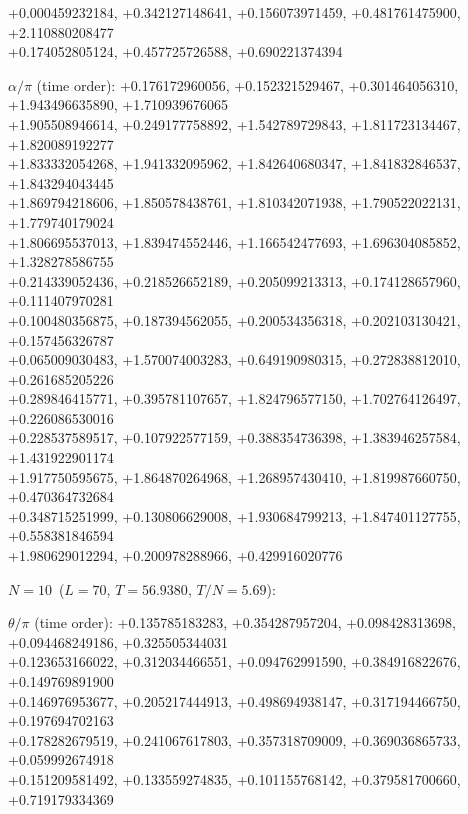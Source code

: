 \begin{flushleft}
+0.000459232184, +0.342127148641, +0.156073971459, +0.481761475900, +2.110880208477 \\
+0.174052805124, +0.457725726588, +0.690221374394
\par\noindent$\alpha/\pi$ (time order):
+0.176172960056, +0.152321529467, +0.301464056310, +1.943496635890, +1.710939676065 \\
+1.905508946614, +0.249177758892, +1.542789729843, +1.811723134467, +1.820089192277 \\
+1.833332054268, +1.941332095962, +1.842640680347, +1.841832846537, +1.843294043445 \\
+1.869794218606, +1.850578438761, +1.810342071938, +1.790522022131, +1.779740179024 \\
+1.806695537013, +1.839474552446, +1.166542477693, +1.696304085852, +1.328278586755 \\
+0.214339052436, +0.218526652189, +0.205099213313, +0.174128657960, +0.111407970281 \\
+0.100480356875, +0.187394562055, +0.200534356318, +0.202103130421, +0.157456326787 \\
+0.065009030483, +1.570074003283, +0.649190980315, +0.272838812010, +0.261685205226 \\
+0.289846415771, +0.395781107657, +1.824796577150, +1.702764126497, +0.226086530016 \\
+0.228537589517, +0.107922577159, +0.388354736398, +1.383946257584, +1.431922901174 \\
+1.917750595675, +1.864870264968, +1.268957430410, +1.819987660750, +0.470364732684 \\
+0.348715251999, +0.130806629008, +1.930684799213, +1.847401127755, +0.558381846594 \\
+1.980629012294, +0.200978288966, +0.429916020776
\vspace{3pt}\par\noindent\textbf{$N=10$}\ ($L=70$, $T=56.9380$, $T/N=5.69$):
\par\noindent$\theta/\pi$ (time order):
+0.135785183283, +0.354287957204, +0.098428313698, +0.094468249186, +0.325505344031 \\
+0.123653166022, +0.312034466551, +0.094762991590, +0.384916822676, +0.149769891900 \\
+0.146976953677, +0.205217444913, +0.498694938147, +0.317194466750, +0.197694702163 \\
+0.178282679519, +0.241067617803, +0.357318709009, +0.369036865733, +0.059992674918 \\
+0.151209581492, +0.133559274835, +0.101155768142, +0.379581700660, +0.719179334369 \\

\end{flushleft}
